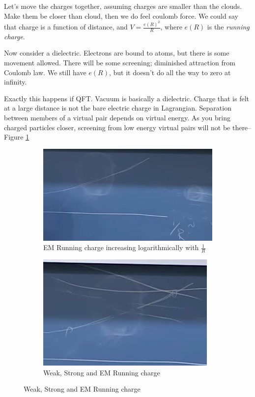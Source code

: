 \documentclass[]{article}
\begin{document}
Let's move the charges together, assuming charges are smaller than the clouds. Make them be closer than cloud, then we do feel coulomb force. We could say that charge is a function of distance, and $V=\frac{e(R)^2}{R}$, where $e(R)$ is the \emph{running charge}.

Now consider a dielectric. Electrons are bound to atoms, but there is some movement allowed. There will be some screening; diminished attraction from Coulomb law. We still have $e(R)$, but it doesn't do all the way to zero at infinity.

Exactly this happens if QFT. Vacuum is basically a dielectric. Charge that is felt at a large distance is not the bare electric charge in Lagrangian. Separation between members of a virtual pair depends on virtual energy. As you bring charged particles closer, screening from low energy virtual pairs will not be there--Figure \ref{fig:2-10-effective-charge}

\begin{figure}[H]
	\caption{Running charges}
	\begin{subfigure}{0.45\textwidth}
		\caption{EM Running charge increasing logarithmically with $\frac{1}{R}$}\label{fig:2-10-effective-charge}
		\includegraphics[width=\textwidth]{2-10-effective-charge}
	\end{subfigure}
	\begin{subfigure}{0.45\textwidth}
		\caption{Weak, Strong and EM Running charge}\label{fig:2-10-effective-charge-esw}
		\includegraphics[width=\textwidth]{2-10-effective-charge-esw}
	\end{subfigure}
\end{figure}
\end{document}
